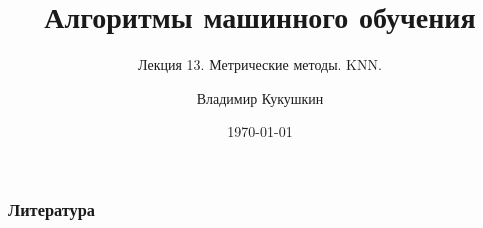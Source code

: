 \documentclass[9pt]{beamer}
\title{Алгоритмы машинного обучения}
\subtitle{Лекция 13. Метрические методы. KNN.}
\author{Владимир Кукушкин}
\institute{СПбГЭУ - 24.03.2021}
\date{\today}
\begin{document}
\titlepage



\begin{frame}[allowframebreaks]
    \frametitle{Литература}
    
    \nocite{esl}
    \nocite{vokov}
    
\end{frame}
\end{document}
